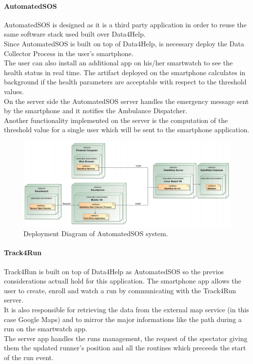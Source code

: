 \documentclass[a4paper]{article}
\begin{document}
\paragraph{AutomatedSOS}
AutomatedSOS is designed as it is a third party application in order to reuse the same software stack used built over Data4Help. \\
Since AutomatedSOS is built on top of Data4Help, is necessary deploy the Data Collector Process in the user's smartphone. \\
The user can also install an additional app on his/her smartwatch to see the health status in real time. The artifact deployed on the smartphone calculates in background if the health parameters are acceptable with respect to the threshold values.\\
On the server side the AutomatedSOS server handles the emergency message sent by the smartphone and it notifies the Ambulance Dispatcher. \\
Another functionality implemented on the server is the computation of the threshold value for a single user which will be sent to the smartphone application.

\begin{figure}[H]
    \centering
    \includegraphics[width=\linewidth]{deploymentDiagram-AutomatedSOS}
    \caption{Deployment Diagram of AutomatedSOS system.}
    \label{fig:my_label}
\end{figure}

\paragraph{Track4Run}
Track4Run is built on top of Data4Help as AutomatedSOS so the previos considerations actuall hold for this application. The smartphone app allows the user to create, enroll and watch a run by communicating with the Track4Run server. \\
It is also responsible for retrieving the data from the external map service (in this case Google Maps) and to mirror the major informations like the path during a run on the smartwatch app. \\
The server app handles the runs management, the request of the spectator giving them the updated runner's position and all the routines which preceeds the start of the run event.
\end{document}

